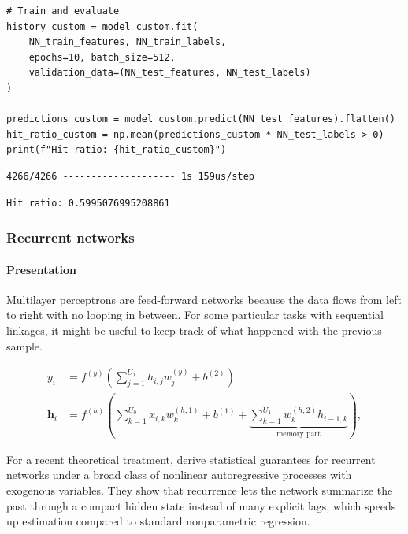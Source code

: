 \begin{verbatim}
# Train and evaluate
history_custom = model_custom.fit(
    NN_train_features, NN_train_labels,
    epochs=10, batch_size=512,
    validation_data=(NN_test_features, NN_test_labels)
)

predictions_custom = model_custom.predict(NN_test_features).flatten()
hit_ratio_custom = np.mean(predictions_custom * NN_test_labels > 0)
print(f"Hit ratio: {hit_ratio_custom}")
\end{verbatim}

\begin{verbatim}
4266/4266 -------------------- 1s 159us/step
\end{verbatim}

\begin{verbatim}
Hit ratio: 0.5995076995208861
\end{verbatim}

\subsubsection{Recurrent networks}\label{RNN}

\paragraph{Presentation}

Multilayer perceptrons are feed-forward networks because the data flows from left to right with no looping in between. For some particular tasks with sequential linkages, it might be useful to keep track of what happened with the previous sample.

\begin{equation}
\begin{aligned}
\tilde{y}_i&=f^{(y)}\left(\sum_{j=1}^{U_1}h_{i,j}w^{(y)}_j+b^{(2)}\right) \\
\textbf{h}_{i} &=f^{(h)}\left(\sum_{k=1}^{U_0}x_{i,k}w^{(h,1)}_k+b^{(1)}+ \underbrace{\sum_{k=1}^{U_1}  w^{(h,2)}_{k}h_{i-1,k}}_{\text{memory part}} \right),
\end{aligned}
\end{equation}

For a recent theoretical treatment, \cite{chen2026recurrent} derive statistical guarantees for recurrent networks under a broad class of nonlinear autoregressive processes with exogenous variables. They show that recurrence lets the network summarize the past through a compact hidden state instead of many explicit lags, which speeds up estimation compared to standard nonparametric regression.

